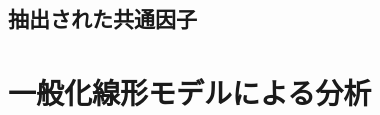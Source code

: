 \documentclass[a4j,11pt,mc]{jreport}
\begin{document}
%	　
%
%	　
%	 　


\section{抽出された共通因子}


%
%
%
%
%
%
%








\chapter{一般化線形モデルによる分析}\label{glm}
\end{document}
